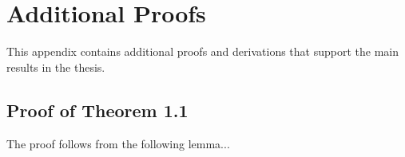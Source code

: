 \chapter{Additional Proofs}
\label{app:proofs}

This appendix contains additional proofs and derivations that support the main results in the thesis.

\section{Proof of Theorem 1.1}
\label{app:proof-thm1}

The proof follows from the following lemma...

